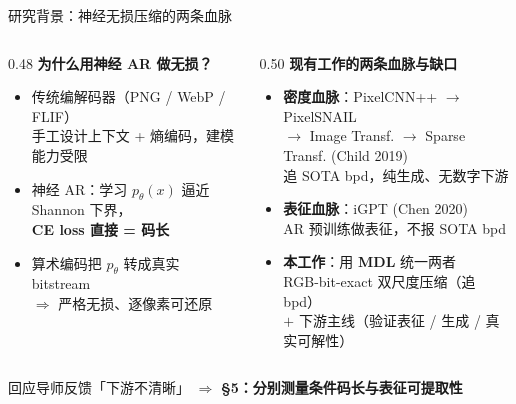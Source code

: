 \documentclass[10pt,aspectratio=169]{beamer}
\begin{document}
\begin{frame}{研究背景：神经无损压缩的两条血脉}
\begin{columns}[T]
\begin{column}{0.48\textwidth}
\textbf{为什么用神经 AR 做无损？}
\begin{itemize}\setlength{\itemsep}{3pt}
  \item 传统编解码器（PNG / WebP / FLIF）\\
        手工设计上下文 + 熵编码，建模能力受限
  \item 神经 AR：学习 $p_\theta(x)$ 逼近 Shannon 下界，\\
        \textbf{CE loss 直接 = 码长}
  \item 算术编码把 $p_\theta$ 转成真实 bitstream \\
        $\Rightarrow$ 严格无损、逐像素可还原
\end{itemize}
\end{column}
\begin{column}{0.50\textwidth}
\textbf{现有工作的两条血脉与缺口}
\begin{itemize}\setlength{\itemsep}{3pt}
  \item \textbf{密度血脉}：PixelCNN++ $\to$ PixelSNAIL \\
        $\to$ Image Transf. $\to$ Sparse Transf. (Child 2019) \\
        {\scriptsize 追 SOTA bpd，纯生成、\alert{无数字下游}}
  \item \textbf{表征血脉}：iGPT (Chen 2020) \\
        {\scriptsize AR 预训练做表征，\alert{不报 SOTA bpd}}
  \item \alert{\textbf{本工作}}：用 \textbf{MDL} 统一两者 \\
        {\scriptsize RGB-bit-exact 双尺度压缩（追 bpd）\\
         $+$ 下游主线（验证表征 / 生成 / 真实可解性）}
\end{itemize}
\end{column}
\end{columns}

\vfill
\centering\small
\color{muted}
回应导师反馈「下游不清晰」 $\Rightarrow$ \color{ours}\textbf{§5：分别测量条件码长与表征可提取性}
\end{frame}
\end{document}
